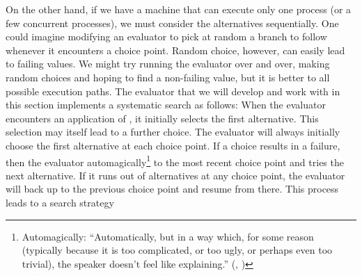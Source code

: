 On the other hand, if we have a machine that can execute only one process (or a
few concurrent processes), we must consider the alternatives sequentially.  One
could imagine modifying an evaluator to pick at random a branch to follow
whenever it encounters a choice point.  Random choice, however, can easily lead
to failing values.  We might try running the evaluator over and over, making
random choices and hoping to find a non-failing value, but it is better to
 all possible execution paths.  The 
evaluator that we will develop and work with in this section implements a
systematic search as follows: When the evaluator encounters an application of
, it initially selects the first alternative.  This selection may
itself lead to a further choice.  The evaluator will always initially choose
the first alternative at each choice point.  If a choice results in a failure,
then the evaluator automagically\footnote{Automagically: ``Automatically, but
in a way which, for some reason (typically because it is too complicated, or
too ugly, or perhaps even too trivial), the speaker doesn't feel like
explaining.''  (, )\label{Footnote 4.47}}
 to the most
recent choice point and tries the next alternative.  If it runs out of
alternatives at any choice point, the evaluator will back up to the previous
choice point and resume from there.  This process leads to a search strategy
